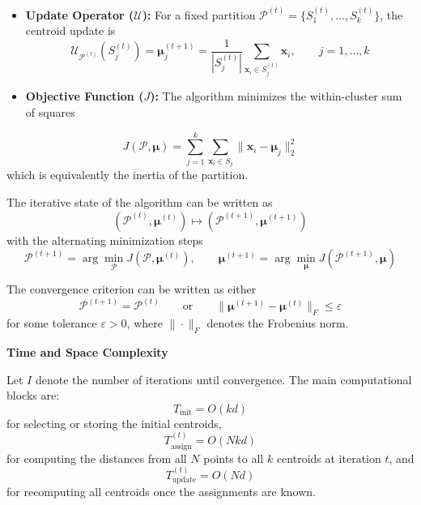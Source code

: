 \begin{itemize}
  \item \textbf{Update Operator ($\mathcal{U}$):} For a fixed partition $\mathcal{P}^{(t)} = \{S_1^{(t)}, \dots, S_k^{(t)}\}$, the centroid update is
  \begin{equation}
    \mathcal{U}_{\mathcal{P}^{(t)}}(S_j^{(t)}) = \boldsymbol{\mu}^{(t+1)}_j
    = \frac{1}{|S_j^{(t)}|}\sum_{\mathbf{x}_i \in S_j^{(t)}} \mathbf{x}_i, \qquad j = 1,\dots,k
  \end{equation}

  \item \textbf{Objective Function ($J$):} The algorithm minimizes the within-cluster sum of squares
\end{itemize}
\begin{equation}
  J(\mathcal{P}, \boldsymbol{\mu}) = \sum_{j=1}^{k}\sum_{\mathbf{x}_i \in S_j}\|\mathbf{x}_i - \boldsymbol{\mu}_j\|_2^2
\end{equation}
which is equivalently the inertia of the partition.

The iterative state of the algorithm can be written as
\begin{equation}
  \left(\mathcal{P}^{(t)}, \boldsymbol{\mu}^{(t)}\right) \mapsto
  \left(\mathcal{P}^{(t+1)}, \boldsymbol{\mu}^{(t+1)}\right)
\end{equation}
with the alternating minimization steps
\begin{equation}
  \mathcal{P}^{(t+1)} = \arg\min_{\mathcal{P}} J(\mathcal{P}, \boldsymbol{\mu}^{(t)}),
  \qquad
  \boldsymbol{\mu}^{(t+1)} = \arg\min_{\boldsymbol{\mu}} J(\mathcal{P}^{(t+1)}, \boldsymbol{\mu})
\end{equation}

The convergence criterion can be written as either
\begin{equation}
  \mathcal{P}^{(t+1)} = \mathcal{P}^{(t)}
  \qquad \text{or} \qquad
  \|\boldsymbol{\mu}^{(t+1)} - \boldsymbol{\mu}^{(t)}\|_F \le \varepsilon
\end{equation}
for some tolerance $\varepsilon > 0$, where $\|\cdot\|_F$ denotes the Frobenius norm.

\textbf{Time and Space Complexity}

Let $I$ denote the number of iterations until convergence. The main computational blocks are:
\begin{equation}
  T_{\text{init}} = O(kd)
\end{equation}
for selecting or storing the initial centroids,
\begin{equation}
  T_{\text{assign}}^{(t)} = O(Nkd)
\end{equation}
for computing the distances from all $N$ points to all $k$ centroids at iteration $t$, and
\begin{equation}
  T_{\text{update}}^{(t)} = O(Nd)
\end{equation}
for recomputing all centroids once the assignments are known.

